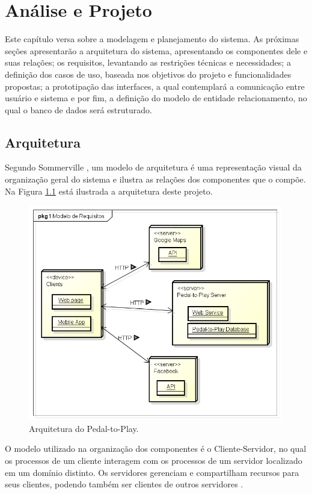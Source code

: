 \chapter{Análise e Projeto} \label{cap:espec}
Este capítulo versa sobre a modelagem e planejamento do sistema. As próximas seções apresentarão a arquitetura do sistema, apresentando os componentes dele e suas relações; os requisitos, levantando as restrições técnicas e necessidades; a definição dos casos de uso, baseada nos objetivos do projeto e funcionalidades propostas; a prototipação das interfaces, a qual contemplará a comunicação entre usuário e sistema e por fim, a definição do modelo de entidade relacionamento, no qual o banco de dados será estruturado.  

\section{Arquitetura}
Segundo Sommerville \citeyearpar{sommerville2003engenharia}, um modelo de arquitetura é uma representação visual da organização geral do sistema e ilustra as relações dos componentes que o compõe. Na Figura \ref{fig:arquitetura} está ilustrada a arquitetura deste projeto.

\begin{figure}[hb]
    \caption{Arquitetura do Pedal-to-Play.}
    \centerline{\includegraphics[width=30em]{figuras/arquitetura.png}}
    \label{fig:arquitetura}
\end{figure}

O modelo utilizado na organização dos componentes é o Cliente-Servidor,
no qual os processos de um cliente interagem com os processos de um servidor localizado em um domínio distinto. Os servidores gerenciam e compartilham recursos para seus clientes, podendo também ser clientes de outros servidores \cite{sommerville2003engenharia}.

